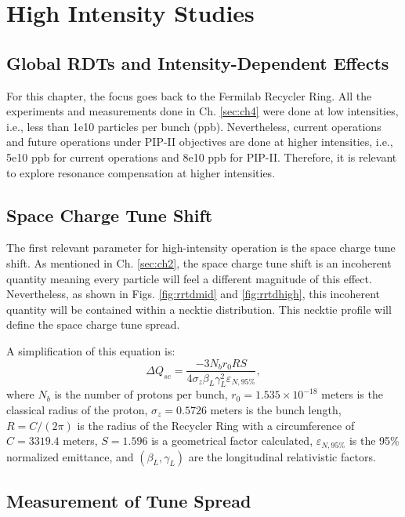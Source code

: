 \chapter{High Intensity Studies}
\label{sec:ch6}

\section{Global RDTs and Intensity-Dependent Effects}

For this chapter, the focus goes back to the Fermilab Recycler Ring. All the experiments and measurements done in Ch. \ref{sec:ch4} were done at low intensities, i.e., less than 1e10 particles per bunch (ppb). Nevertheless, current operations and future operations under PIP-II objectives are done at higher intensities, i.e., 5e10 ppb for current operations and 8e10 ppb for PIP-II. Therefore, it is relevant to explore resonance compensation at higher intensities. 

\section{Space Charge Tune Shift}

The first relevant parameter for high-intensity operation is the space charge tune shift. As mentioned in Ch. \ref{sec:ch2}, the space charge tune shift is an incoherent quantity meaning every particle will feel a different magnitude of this effect. Nevertheless, as shown in Figs. \ref{fig:rrtdmid} and \ref{fig:rrtdhigh}, this incoherent quantity will be contained within a necktie distribution. This necktie profile will define the space charge tune spread. 

A simplification of this equation is:
\begin{equation}
    \label{eq:tunesc}
    \Delta Q_{sc}=\frac{-3 N_b r_0 R S}{4 \sigma_z \beta_L \gamma_L ^2 \varepsilon_{N,95\%}},    
\end{equation}
where $N_b$ is the number of protons per bunch, $r_0=1.535\times 10^{-18}$ meters is the classical radius of the proton, $\sigma_z = 0.5726$ meters is the bunch length, $R = C/(2 \pi)$ is the radius of the Recycler Ring with a circumference of $C=3319.4$ meters, $S=1.596$ is a geometrical factor calculated, $\varepsilon_{N,95\%}$ is the 95\% normalized emittance, and $(\beta_L,\gamma_L)$ are the longitudinal relativistic factors.   

\section{Measurement of Tune Spread}

